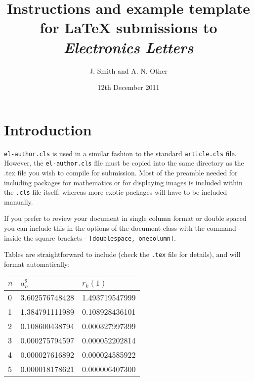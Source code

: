 \documentclass[11pt]{report}
\date{12th December 2011}
\begin{document}
\title{Instructions and example template for \LaTeX{} submissions to \emph{Electronics Letters}}

\author{J. Smith and A. N. Other}


\maketitle

\section{Introduction}

\verb"el-author.cls" is used in a similar fashion to the standard \verb"article.cls" file. However, the \verb"el-author.cls" file must be copied into the same directory as the .tex file you wish to compile for submission. Most of the preamble needed for including packages for mathematics or for displaying images is included within the \verb".cls" file itself, whereas more exotic packages will have to be included manually.

If you prefer to review your document in single column format or double spaced you can include this in the options of the document class with the command - inside the square brackets - \verb"[doublespace, onecolumn]".

Tables are straightforward to include (check the \verb".tex" file for details), and will format automatically:
\begin{table}[h]
{\begin{tabular}{|l|l|l|}\hline
$n$ & $a_{n}^{2}$ & $r_{k}(1)$\\\hline
0 & 3.602576748428 & 1.493719547999\\\hline
1 & 1.384791111989 & 0.108928436101\\\hline
2 & 0.108600438794 & 0.000327997399\\\hline
3 & 0.000275794597 & 0.000052202814\\\hline
4 & 0.000027616892 & 0.000024585922\\\hline
5 & 0.000018178621 & 0.000006407300\\\hline
\end{tabular}}{}
\end{table}
\end{document}
